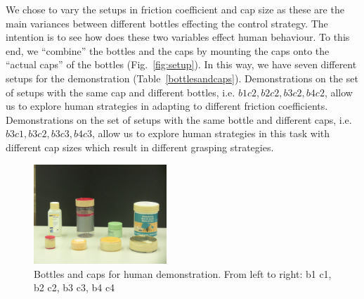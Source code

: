 We chose to vary the setups in friction coefficient and cap size as these are the main variances between different bottles effecting the control strategy. The intention is to see how does these two variables effect human behaviour. To this end, we ``combine'' the bottles and the caps by mounting the caps onto the ``actual caps'' of the bottles (Fig.~\ref{fig:setup}). In this way, we have seven different setups for the demonstration (Table~\ref{bottlesandcaps}). Demonstrations on the set of setups with the same cap and different bottles, i.e. $b1c2, b2c2, b3c2, b4c2$, allow us to explore human strategies in adapting to different friction coefficients. Demonstrations on the set of setups with the same bottle and different caps, i.e. $b3c1, b3c2, b3c3, b4c3$, allow us to explore human strategies in this task with different cap sizes which result in different grasping strategies.

\begin{figure}
  \centering
  \includegraphics[width=5cm]{./fig/b_c.jpg}
  \caption{ \scriptsize{Bottles and caps for human demonstration. From left to right: b1 c1, b2 c2, b3 c3, b4  c4}
}
\label{fig:b_c}
\end{figure}






